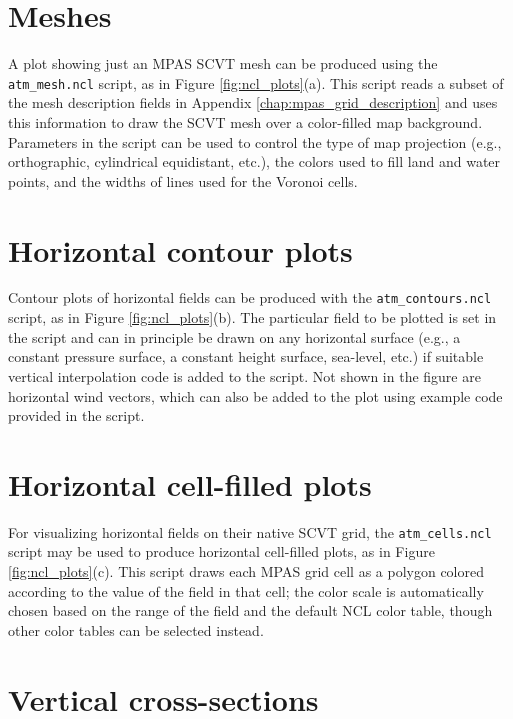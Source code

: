 \section{Meshes}

A plot showing just an MPAS SCVT mesh can be produced using the {\tt atm\_mesh.ncl} script, as in Figure \ref{fig:ncl_plots}(a). This script
reads a subset of the mesh description fields in Appendix \ref{chap:mpas_grid_description} and uses this information to draw the SCVT mesh over a 
color-filled map background. Parameters in the script can be used to control the type of map projection (e.g., orthographic, cylindrical equidistant, etc.), 
the colors used to fill land and water points, and the widths of lines used for the Voronoi cells.


\section{Horizontal contour plots}

Contour plots of horizontal fields can be produced with the {\tt atm\_contours.ncl} script, as in Figure \ref{fig:ncl_plots}(b). The particular
field to be plotted is set in the script and can in principle be drawn on any horizontal surface (e.g., a constant pressure
surface, a constant height surface, sea-level, etc.) if suitable vertical interpolation code is added to the script. Not shown in the figure are horizontal
wind vectors, which can also be added to the plot using example code provided in the script.


\section{Horizontal cell-filled plots}

For visualizing horizontal fields on their native SCVT grid, the {\tt atm\_cells.ncl} script may be used to produce horizontal cell-filled plots, 
as in Figure \ref{fig:ncl_plots}(c). This script draws each MPAS grid cell as a polygon colored according to the value of the field in that
cell; the color scale is automatically chosen based on the range of the field and the default NCL color table, though other color tables can
be selected instead.


\section{Vertical cross-sections}

